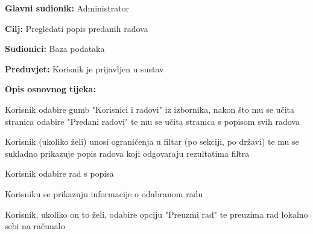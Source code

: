 					\noindent {}
					\begin{packed_item}
	
						\item \textbf{Glavni sudionik: } Administrator
						\item  \textbf{Cilj:} Pregledati popis predanih radova
						\item  \textbf{Sudionici:} Baza podataka
						\item  \textbf{Preduvjet:} Korisnik je prijavljen u sustav
						\item  \textbf{Opis osnovnog tijeka:}
						
						\item[] \begin{packed_enum}
	
							\item Korisnik odabire gumb "Korisnici i radovi" iz izbornika, nakon što mu se učita stranica odabire "Predani radovi" te mu se učita stranica s popisom svih radova
							\item Korisnik (ukoliko želi) unosi ograničenja u filtar (po sekciji, po državi) te mu se sukladno prikazuje popis radova koji odgovaraju rezultatima filtra
							\item Korisnik odabire rad s popisa
							\item Korisniku se prikazuju informacije o odabranom radu
							\item Korisnik, ukoliko on to želi, odabire opciju "Preuzmi rad" te preuzima rad lokalno sebi na računalo

					
						\end{packed_enum}
			
					\end{packed_item}
				
					\noindent {}
					
